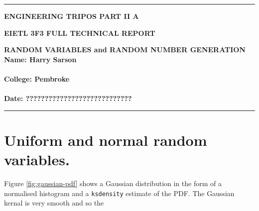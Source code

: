 \documentclass[12pt]{article}
\newcommand{\code}[1]{\texttt{#1}}
\begin{document}
\noindent
\rule{15.7cm}{0.5mm}


\begin{center}
{\bf ENGINEERING TRIPOS PART II A}
\end{center}
\vspace{0.5cm} {\bf EIETL \hfill 3F3 FULL TECHNICAL REPORT}
\vspace{0.5cm}
\begin{center}
{\bf RANDOM VARIABLES and RANDOM NUMBER GENERATION\\
Name: Harry Sarson \\\hfill\\
College: Pembroke \\\hfill
\\
Date: ????????????????????????????	
}
\end{center}
\rule{15.7cm}{0.5mm}

\pagebreak

\section{Uniform and normal random variables.}

Figure \ref{fig:gaussian-pdf} shows a Gaussian distribution in the form of a normalised histogram and a \code{ksdensity} estimate of the PDF. The Gaussian kernal is very smooth and so the
\end{document}
